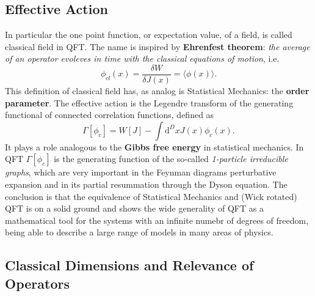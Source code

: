 \subsection{Effective Action}

In particular the one point function, or expectation value, of a field, is called classical field in QFT.
The name is inspired by \textbf{Ehrenfest theorem}: \textit{the average of an operator evoleves in time with the classical equations of motion}, i.e.
\[
    \phi_{cl}(x)=\frac{\delta W}{\delta J(x)}=\langle\phi(x)\rangle.
\]
This definition of classical field has, as analog is Statistical Mechanics: the \textbf{order parameter}.
The effective action is the Legendre transform of the generating functional of connected correlation functions, defined as
\[
    \Gamma[\phi_{c}] = W[J]-\int \mathrm{d}^{D}xJ(x)\phi_{c}(x).
\]
It plays a role analogous to the \textbf{Gibbs free energy} in statistical mechanics.
In QFT \(\Gamma[\phi_{c}]\) is the generating function of the so-called \textit{1-particle irreducible graphs}, which are very important in the Feynman diagrams perturbative expansion and in its partial resummation through the Dyson equation.
The conclusion is that the equivalence of Statistical Mechanics and (Wick rotated) QFT is on a solid ground and shows the wide generality of QFT as a mathematical tool for the systems with an infinite numebr of degrees of freedom, being able to describe a large range of models in many areas of physics.

\subsection{Classical Dimensions and Relevance of Operators}

